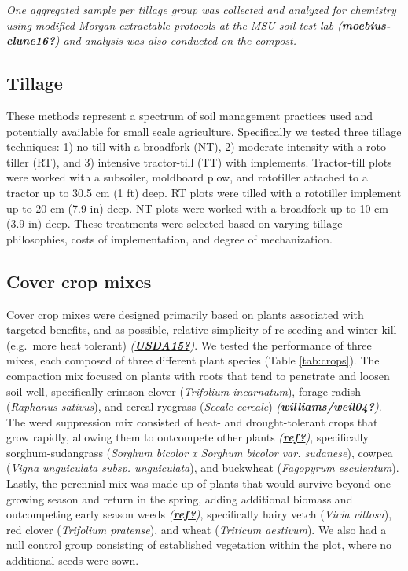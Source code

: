 \documentclass[
]{article}
\begin{document}
\emph{One aggregated sample per tillage group was collected and analyzed for chemistry using modified Morgan-extractable protocols at the MSU soil test lab (\protect\hyperlink{ref-moebius-clune16}{\textbf{moebius-clune16?}}) and analysis was also conducted on the compost.}

\hypertarget{tillage}{%
\subsection{Tillage}\label{tillage}}

These methods represent a spectrum of soil management practices used and potentially available for small scale agriculture.
Specifically we tested three tillage techniques:
1) no-till with a broadfork (NT),
2) moderate intensity with a roto-tiller (RT), and
3) intensive tractor-till (TT) with implements.
Tractor-till plots were worked with a subsoiler, moldboard plow, and rototiller attached to a tractor up to 30.5 cm (1 ft) deep.
RT plots were tilled with a rototiller implement up to 20 cm (7.9 in) deep.
NT plots were worked with a broadfork up to 10 cm (3.9 in) deep.
These treatments were selected based on varying tillage philosophies, costs of implementation, and degree of mechanization.

\hypertarget{cover-crop-mixes}{%
\subsection{Cover crop mixes}\label{cover-crop-mixes}}

Cover crop mixes were designed primarily based on plants associated with targeted benefits, and as possible, relative simplicity of re-seeding and winter-kill (e.g.~more heat tolerant) \emph{(\protect\hyperlink{ref-USDA15}{\textbf{USDA15?}})}.
We tested the performance of three mixes, each composed of three different plant species (Table \ref{tab:crops}).
The compaction mix focused on plants with roots that tend to penetrate and loosen soil well, specifically crimson clover (\emph{Trifolium incarnatum}), forage radish (\emph{Raphanus sativus}), and cereal ryegrass (\emph{Secale cereale}) \emph{(\protect\hyperlink{ref-williamsux2fweil04}{\textbf{williams/weil04?}})}.
The weed suppression mix consisted of heat- and drought-tolerant crops that grow rapidly, allowing them to outcompete other plants \emph{(\protect\hyperlink{ref-ref}{\textbf{ref?}})}, specifically sorghum-sudangrass (\emph{Sorghum bicolor x Sorghum bicolor var. sudanese}), cowpea (\emph{Vigna unguiculata subsp. unguiculata}), and buckwheat (\emph{Fagopyrum esculentum}).
Lastly, the perennial mix was made up of plants that would survive beyond one growing season and return in the spring, adding additional biomass and outcompeting early season weeds \emph{(\protect\hyperlink{ref-ref}{\textbf{ref?}})}, specifically hairy vetch (\emph{Vicia villosa}), red clover (\emph{Trifolium pratense}), and wheat (\emph{Triticum aestivum}).
We also had a null control group consisting of established vegetation within the plot, where no additional seeds were sown.
\end{document}
